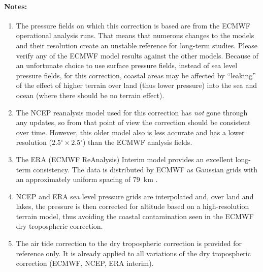 \documentclass[a4paper,11pt,openany,natbib,nomargin]{thesis}
\renewcommand\deg{\ensuremath{^\circ}}
\newenvironment{notes}[1][Notes:]{\FloatBarrier\paragraph{#1}\begin{enumerate}}{\end{enumerate}}
\begin{document}
\begin{notes}
\item The pressure fields on which this correction is based are from the ECMWF operational analysis runs. That means that numerous changes to the models and their resolution create an unstable reference for long-term studies. Please verify any of the ECMWF model results against the other models. Because of an unfortunate choice to use surface pressure fields, instead of sea level pressure fields, for this correction, coastal areas may be affected by ``leaking'' of the effect of higher terrain over land (thus lower pressure) into the sea and ocean (where there should be no terrain effect).\label{item:dry_tropo_ecmwf}
\item The NCEP reanalysis model used for this correction has \emph{not} gone through any updates, so from that point of view the correction should be consistent over time. However, this older model also is less accurate and has a lower resolution ($2.5\deg\times2.5\deg$) than the ECMWF analysis fields. \label{item:dry_tropo_ncep}
\item The ERA (ECMWF ReAnalysis) Interim model provides an excellent long-term consistency. The data is distributed by ECMWF as Gaussian grids with an approximately uniform spacing of 79~km \citep{berrisford2011}.\label{item:dry_tropo_era}
\item NCEP and ERA sea level pressure grids are interpolated and, over land and lakes, the pressure is then corrected for altitude based on a high-resolution terrain model, thus avoiding the coastal contamination seen in the ECMWF dry tropospheric correction.\label{item:dry_tropo_lakes}
\item The air tide correction to the dry tropospheric correction is provided for reference only. It is already applied to all variations of the dry tropospheric correction (ECMWF, NCEP, ERA interim).\label{item:dry_tropo_airtide}
\end{notes}
\end{document}
